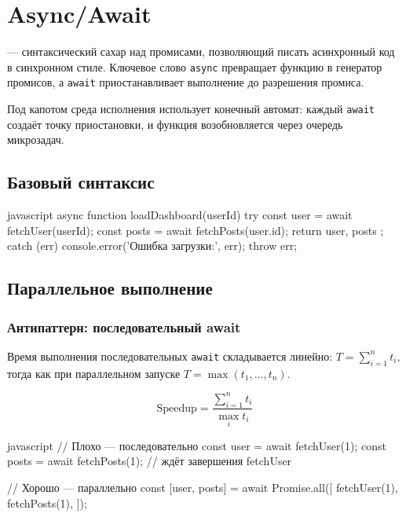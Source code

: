 \section{Async/Await}

 — синтаксический сахар над
промисами, позволяющий писать асинхронный код в синхронном стиле.
Ключевое слово \texttt{async} превращает функцию в генератор промисов,
а \texttt{await} приостанавливает выполнение до разрешения промиса.

Под капотом среда исполнения использует конечный автомат: каждый
\texttt{await} создаёт точку приостановки, и функция возобновляется
через очередь микрозадач.

\subsection{Базовый синтаксис}

\begin{code}{javascript}
async function loadDashboard(userId) {
  try {
    const user = await fetchUser(userId);
    const posts = await fetchPosts(user.id);
    return { user, posts };
  } catch (err) {
    console.error('Ошибка загрузки:', err);
    throw err;
  }
}
\end{code}

\subsection{Параллельное выполнение}

\subsubsection{Антипаттерн: последовательный await}

Время выполнения последовательных \texttt{await} складывается линейно:
$T = \sum_{i=1}^{n} t_i$, тогда как при параллельном запуске
$T = \max(t_1, \ldots, t_n)$.

\begin{equation}
  \text{Speedup} = \frac{\sum_{i=1}^{n} t_i}{\max_{i} t_i}
\end{equation}

\begin{code}{javascript}
// Плохо — последовательно
const user = await fetchUser(1);
const posts = await fetchPosts(1);   // ждёт завершения fetchUser

// Хорошо — параллельно
const [user, posts] = await Promise.all([
  fetchUser(1),
  fetchPosts(1),
]);
\end{code}


